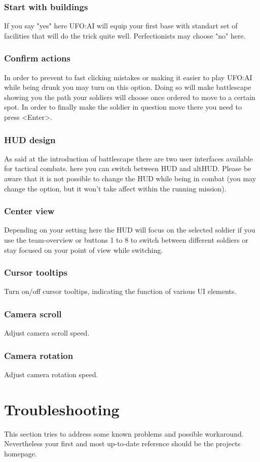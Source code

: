 \subsubsection*{Start with buildings}
If you say "yes" here UFO:AI will equip your first base with standart set of facilities that will do the trick quite well. Perfectionists may choose "no" here.
\subsubsection*{Confirm actions}
In order to prevent to fast clicking mistakes or making it easier to play UFO:AI while being drunk you may turn on this option. Doing so will make battlescape showing you the path your soldiers will choose once ordered to move to a certain spot. In order to finally make the soldier in question move there you need to press <Enter>.
\subsubsection*{HUD design}
As said at the introduction of battlescape there are two user interfaces available for tactical combats. here you can switch between HUD and altHUD. Please be aware that it is not possible to change the HUD while being in combat (you may change the option, but it won't take affect within the running mission).
\subsubsection*{Center view}
Depending on your setting here the HUD will focus on the selected soldier if you use the team-overview or buttons 1 to 8 to switch between different soldiers or stay focused on your point of view while switching.
\subsubsection*{Cursor tooltips}
Turn on/off cursor tooltips, indicating the function of various UI elements.
\subsubsection*{Camera scroll}
Adjust camera scroll speed.
\subsubsection*{Camera rotation}
Adjust camera rotation speed.

\section{Troubleshooting}
This section tries to address some known problems and possible workaround. Nevertheless your first and most up-to-date reference should be the projects homepage.

